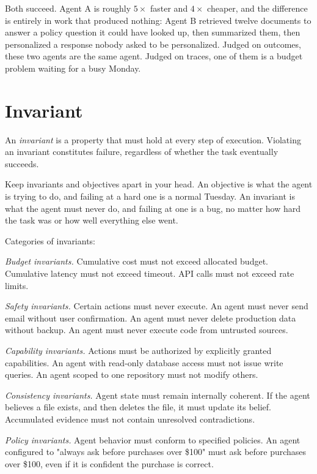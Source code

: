 Both succeed. Agent A is roughly $5\times$ faster and $4\times$ cheaper, and the difference is entirely in work that produced nothing: Agent B retrieved twelve documents to answer a policy question it could have looked up, then summarized them, then personalized a response nobody asked to be personalized. Judged on outcomes, these two agents are the same agent. Judged on traces, one of them is a budget problem waiting for a busy Monday.

\section{Invariant}

An \emph{invariant} is a property that must hold at every step of execution. Violating an invariant constitutes failure, regardless of whether the task eventually succeeds.

Keep invariants and objectives apart in your head. An objective is what the agent is trying to do, and failing at a hard one is a normal Tuesday. An invariant is what the agent must never do, and failing at one is a bug, no matter how hard the task was or how well everything else went.

Categories of invariants:

\textit{Budget invariants.} Cumulative cost must not exceed allocated budget. Cumulative latency must not exceed timeout. API calls must not exceed rate limits.

\textit{Safety invariants.} Certain actions must never execute. An agent must never send email without user confirmation. An agent must never delete production data without backup. An agent must never execute code from untrusted sources.

\textit{Capability invariants.} Actions must be authorized by explicitly granted capabilities. An agent with read-only database access must not issue write queries. An agent scoped to one repository must not modify others.

\textit{Consistency invariants.} Agent state must remain internally coherent. If the agent believes a file exists, and then deletes the file, it must update its belief. Accumulated evidence must not contain unresolved contradictions.

\textit{Policy invariants.} Agent behavior must conform to specified policies. An agent configured to "always ask before purchases over \$100" must ask before purchases over \$100, even if it is confident the purchase is correct.

